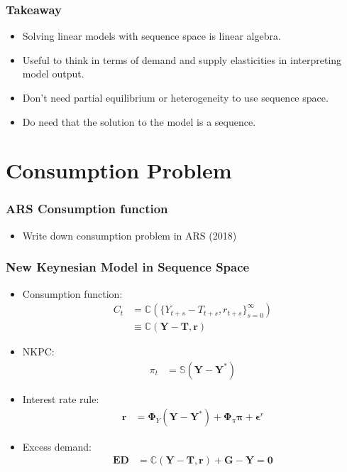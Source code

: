 \documentclass[english,xcolor=svgnames]{beamer}
\begin{document}
\begin{frame}
    \frametitle{Takeaway}
    \begin{itemize}
        \item Solving linear models with sequence space is linear algebra.
        \item Useful to think in terms of demand and supply elasticities in interpreting model output.
        \item Don't need partial equilibrium or heterogeneity to use sequence space.
        \item Do need that the solution to the model is a sequence.
\end{itemize}
\end{frame}

\section{Consumption Problem}


\begin{frame}
    \frametitle{ARS Consumption function}
    \begin{itemize}
        \item Write down consumption problem in ARS (2018)
\end{itemize}
\end{frame}


\begin{frame}
    \frametitle{New Keynesian Model in Sequence Space}
    \begin{itemize}
        \item Consumption function:
        \begin{align*}
            C_t &= \mathbb{C}(\{Y_{t+s}-T_{t+s},r_{t+s}\}_{s=0}^{\infty}) \\
            &\equiv \mathbb{C}(\bm{Y}-\bm{T},\bm{r})
        \end{align*}
        \item NKPC:
        \begin{align*}
            \pi_t &= \mathbb{S}(\bm{Y} - \bm{Y}^*) 
        \end{align*}
        \item Interest rate rule:
        \begin{align*}
            \bm{r} &= \bm{\Phi}_Y (\bm{Y} - \bm{Y}^*) +  \bm{\Phi}_\pi \bm{\pi} + \bm{\epsilon}^r 
        \end{align*}
        \item Excess demand:
        \begin{align*}
            \bm{ED} &= \pmb{\mathbb{C}}(\bm{Y}-\bm{T},\bm{r}) + \bm{G} - \bm{Y} =\bm{0}
        \end{align*}
    \end{itemize}
\end{frame}
\end{document}
